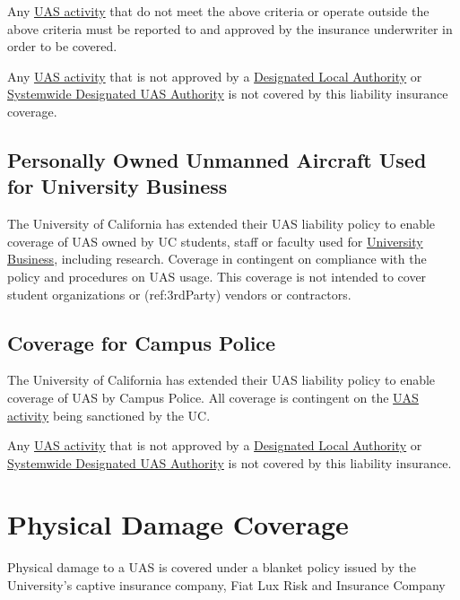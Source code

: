 \documentclass[
]{book}
\begin{document}
Any \protect\hyperlink{UASactivity}{UAS activity} that do not meet the above criteria or operate outside the above criteria must be reported to and approved by the insurance underwriter in order to be covered.

Any \protect\hyperlink{UASactivity}{UAS activity} that is not approved by a \protect\hyperlink{DLA}{Designated Local Authority} or \protect\hyperlink{SDA}{Systemwide Designated UAS Authority} is not covered by this liability insurance coverage.

\hypertarget{ss-personally-owned-UAS-coverage}{%
\subsection{Personally Owned Unmanned Aircraft Used for University Business}\label{ss-personally-owned-UAS-coverage}}

The University of California has extended their UAS liability policy to enable coverage of UAS owned by UC students, staff or faculty used for \protect\hyperlink{UB}{University Business}, including research. Coverage in contingent on compliance with the policy and procedures on UAS usage. This coverage is not intended to cover student organizations or (ref:3rdParty) vendors or contractors.

\hypertarget{ss-campus-police-coverage}{%
\subsection{Coverage for Campus Police}\label{ss-campus-police-coverage}}

The University of California has extended their UAS liability policy to enable coverage of UAS by Campus Police. All coverage is contingent on the \protect\hyperlink{UASactivity}{UAS activity} being sanctioned by the UC.

Any \protect\hyperlink{UASactivity}{UAS activity} that is not approved by a \protect\hyperlink{DLA}{Designated Local Authority} or \protect\hyperlink{SDA}{Systemwide Designated UAS Authority} is not covered by this liability insurance.

\hypertarget{s-UC-physical-damage}{%
\section{Physical Damage Coverage}\label{s-UC-physical-damage}}

Physical damage to a UAS is covered under a blanket policy issued by the University's captive insurance company, Fiat Lux Risk and Insurance Company
\end{document}
